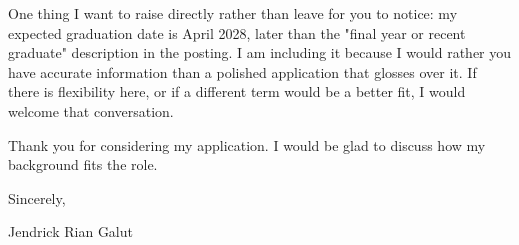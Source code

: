 \documentclass[letterpaper,11pt]{article}
\begin{document}
One thing I want to raise directly rather than leave for you to notice: my expected graduation date is April 2028, later than the "final year or recent graduate" description in the posting. I am including it because I would rather you have accurate information than a polished application that glosses over it. If there is flexibility here, or if a different term would be a better fit, I would welcome that conversation.

Thank you for considering my application. I would be glad to discuss how my background fits the role.

Sincerely,

Jendrick Rian Galut
\end{document}
